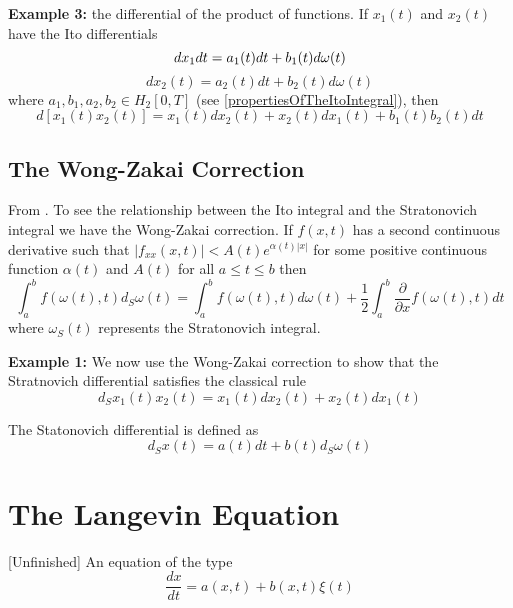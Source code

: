 \documentclass[12pt]{book}
\begin{document}
\textbf{Example 3:} the differential of the product of functions. If $x_1(t)$ and $x_2(t)$ have the Ito differentials
\begin{equation*}
dx_1dt = a_1(t)dt +b_1(t)d\omega(t)\\
\end{equation*}
\begin{equation*}
dx_2(t) =a_2(t)dt+b_2(t)d\omega(t) 
\end{equation*}
where $a_1,b_1,a_2,b_2\in H_2[0,T]$ (see \ref{propertiesOfTheItoIntegral}), then
\begin{equation*}
d[x_1(t)x_2(t)]= x_1(t)dx_2(t)+x_2(t)dx_1(t)+b_1(t)b_2(t)dt
\end{equation*}

\subsection{The Wong-Zakai Correction}\label{section_theWongZakaiCorrection}
From \cite{schuss2009theory}. To see the relationship between the Ito integral and the Stratonovich integral we have the Wong-Zakai correction.  If $f(x,t)$ has a second continuous derivative such that $|f_{xx}(x,t)|<A(t)e^{\alpha(t)|x|} $ for some positive continuous function $\alpha(t)$ and $A(t)$ for all $a\leq t \leq b$ then
\begin{equation}
\int_{a}^b f(\omega(t),t)d_S\omega(t) = \int_a^b f(\omega(t),t)d\omega(t)+\frac{1}{2}\int_a^b\frac{\partial}{\partial x}f(\omega(t),t)dt
\end{equation}
where $\omega_S(t)$ represents the Stratonovich integral.

\textbf{Example 1:} We now use the Wong-Zakai correction to show that the Stratnovich differential satisfies the classical rule
\begin{equation*}
d_Sx_1(t)x_2(t)= x_1(t)dx_2(t) +x_2(t)dx_1(t)
\end{equation*}

The Statonovich differential is defined as 
\begin{equation*}
d_Sx(t) = a(t)dt+b(t)d_S\omega(t)
\end{equation*}

\section{The Langevin Equation}\label{section_theLangevinEquation}
[Unfinished]
An equation of the type 
\begin{equation*}
\frac{dx}{dt}=a(x,t)+b(x,t)\xi(t)
\end{equation*}
\end{document}
